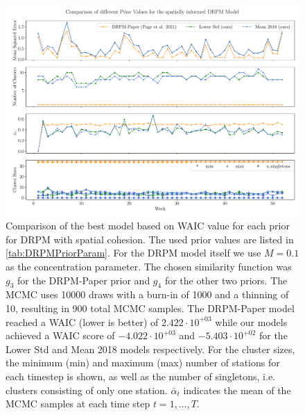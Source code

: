 \documentclass[12pt,a4paper]{article}
\begin{document}
\begin{figure}
    \centering
    \includegraphics[width=.95\linewidth]{./imgs/drpm/drpm_spatial-informed_comparison.pdf}
    \caption{Comparison of the best model based on WAIC value for each prior for DRPM with spatial cohesion.
    The used prior values are listed in \cref{tab:DRPMPriorParam}. For the DRPM model itself we use
    $M=0.1$ as the concentration parameter. The chosen similarity function was $g_3$ for the DRPM-Paper prior and $g_4$ for the other two priors. The MCMC uses 10000 draws with a burn-in of 1000 and a
    thinning of 10, resulting in 900 total MCMC samples. The DRPM-Paper model reached a WAIC (lower is better) of
    $2.422 \cdot 10^{+03}$ while our models achieved a WAIC score of $-4.022 \cdot 10^{+03}$ and
    $-5.403 \cdot 10^{+02}$ for the Lower Std and Mean 2018 models respectively. For the cluster sizes,
    the minimum (min) and maximum (max) number of stations for each timestep is shown, as well as the number of
    singletons, i.e. clusters consisting of only one station. $\bar{\alpha}_t$ indicates the mean of the MCMC
    samples at each time step $t=1, \ldots, T$.}
    \label{fig:drpm_spatial-informed_comparison}
\end{figure}
\end{document}
